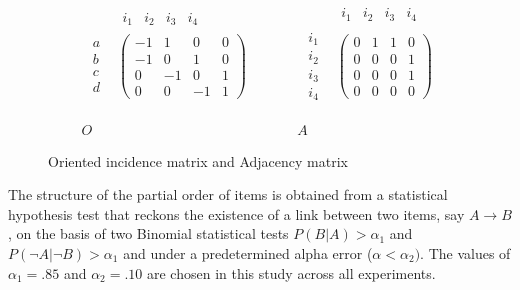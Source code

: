 \begin{figure}
\[
\begin{array}{ccccc}
\begin{array}{cc}
 & \begin{array}{cccc}
i_{1} & i_{2} & i_{3} & i_{4}\end{array}\\
\begin{array}{c}
a\\
b\\
c\\
d
\end{array} & \left(\begin{array}{cccc}
-1 & 1 & 0 & 0\\
-1 & 0 & 1 & 0\\
0 & -1 & 0 & 1\\
0 & 0 & -1 & 1
\end{array}\right)
\end{array} &  &  &  & \begin{array}{cc}
 & \begin{array}{cccc}
i_{1} & i_{2} & i_{3} & i_{4}\end{array}\\
\begin{array}{c}
i_{1}\\
i_{2}\\
i_{3}\\
i_{4}
\end{array} & \left(\begin{array}{cccc}
0 & 1 & 1 & 0\\
0 & 0 & 0 & 1\\
0 & 0 & 0 & 1\\
0 & 0 & 0 & 0
\end{array}\right)
\end{array}\\
\\
\\
O &  &  &  & A
\end{array}
\]


\caption{Oriented incidence matrix and Adjacency matrix}
\label{fig3IMAM}
\end{figure}


The structure of the partial order of items is obtained from a statistical hypothesis test that reckons the existence of a link between two items, say $A \rightarrow B$, on the basis of two Binomial statistical tests $P(B|A) > \alpha_1$ and $P(\neg A|\neg B) > \alpha_1$ and under a predetermined alpha error ($\alpha < \alpha_2)$.  The values of $\alpha_1 = .85$ and $\alpha_2 = .10$ are chosen in this study across all experiments.

